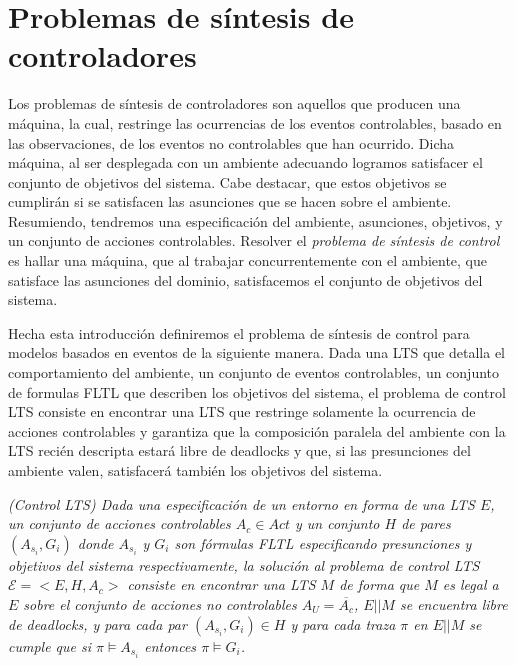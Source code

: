 \section{Problemas de síntesis de controladores}

Los problemas de síntesis de controladores son aquellos que producen una máquina, la cual, restringe las ocurrencias de
los eventos controlables, basado en las observaciones, de los eventos no controlables que han ocurrido. Dicha máquina, al
ser desplegada con un ambiente adecuando logramos satisfacer el conjunto de objetivos del sistema. Cabe destacar, que
estos objetivos se cumplirán si se satisfacen las asunciones que se hacen sobre el ambiente. Resumiendo, tendremos una
especificación del ambiente, asunciones, objetivos, y un conjunto de acciones controlables. Resolver el \emph{problema
de síntesis de control} es hallar una máquina, que al trabajar concurrentemente con el ambiente, que satisface las
asunciones del dominio, satisfacemos el conjunto de objetivos del sistema.

Hecha esta introducción definiremos el problema de síntesis de control para modelos basados en eventos de la siguiente
manera. Dada una LTS que detalla el comportamiento del ambiente, un conjunto de eventos controlables, un conjunto de
formulas FLTL que describen los objetivos del sistema, el problema de control LTS consiste en encontrar una LTS que
restringe solamente la ocurrencia de acciones controlables y garantiza que la composición paralela del ambiente con la
LTS recién descripta estará libre de deadlocks y que, si las presunciones del ambiente valen, satisfacerá también los
objetivos del sistema.

\begin{nahaDef}
    \label{LTS_control}
    \emph{(Control LTS) Dada una especificación de un entorno en forma de una LTS $E$, un conjunto de acciones
    controlables $A_c \in Act$ y un conjunto $H$ de pares $(A_{s_i}, G_i)$ donde $A_{s_i}$ y $G_i$ son fórmulas FLTL
    especificando presunciones y objetivos del sistema respectivamente, la solución al problema de control LTS
    $\mathcal{E} = <E,H,A_c>$ consiste en encontrar una LTS $M$ de forma que $M$ es legal a $E$ sobre el conjunto de acciones
    no controlables $A_U = \overline{A_c}$, $E||M$ se encuentra libre de deadlocks, y para cada par $(A_{s_i}, G_i) \in
    H$ y para cada traza $\pi$ en $E||M$ se cumple que si $\pi \vDash A_{s_i}$ entonces $\pi \vDash G_i$.}
\end{nahaDef}

